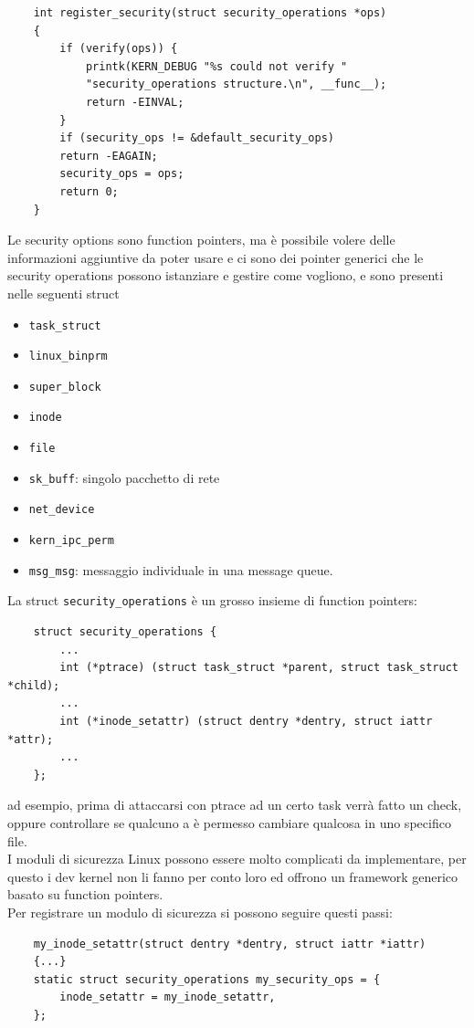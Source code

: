 \documentclass[12pt, oneside]{extbook} %
\begin{document}
\begin{lstlisting}
	int register_security(struct security_operations *ops)
	{
		if (verify(ops)) {
			printk(KERN_DEBUG "%s could not verify "
			"security_operations structure.\n", __func__);
			return -EINVAL;
		}
		if (security_ops != &default_security_ops)
		return -EAGAIN;
		security_ops = ops;
		return 0;
	}
\end{lstlisting}
Le security options sono function pointers, ma è possibile volere delle informazioni aggiuntive da poter usare e ci sono dei pointer generici che le security operations possono istanziare e gestire come vogliono, e sono presenti nelle seguenti struct
\begin{itemize}
\item \texttt{task\_struct}
\item \texttt{linux\_binprm}
\item \texttt{super\_block}
\item \texttt{inode}
\item \texttt{file}
\item \texttt{sk\_buff}: singolo pacchetto di rete
\item \texttt{net\_device}
\item \texttt{kern\_ipc\_perm}
\item \texttt{msg\_msg}: messaggio individuale in una message queue.
\end{itemize}
La struct \texttt{security\_operations} è un grosso insieme di function pointers:
\begin{lstlisting}
	struct security_operations {
		...
		int (*ptrace) (struct task_struct *parent, struct task_struct *child);
		...
		int (*inode_setattr) (struct dentry *dentry, struct iattr *attr);
		...
	};
\end{lstlisting}
ad esempio, prima di attaccarsi con ptrace ad un certo task verrà fatto un check, oppure controllare se qualcuno a è permesso cambiare qualcosa in uno specifico file.\\I moduli di sicurezza Linux possono essere molto complicati da implementare, per questo i dev kernel non li fanno per conto loro ed offrono un framework generico basato su function pointers.\\Per registrare un modulo di sicurezza si possono seguire questi passi:
\begin{lstlisting}
	my_inode_setattr(struct dentry *dentry, struct iattr *iattr)
	{...}
	static struct security_operations my_security_ops = {
		inode_setattr = my_inode_setattr,
	};
\end{lstlisting}
\end{document}
